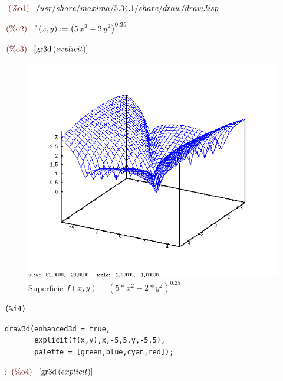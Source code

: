 \documentclass[12pt]{article}
\begin{document}
\begin{math}\displaystyle
\parbox{8ex}{\color{labelcolor}(\%o1) }
/usr/share/maxima/5.34.1/share/draw/draw.lisp
\end{math}

\begin{math}\displaystyle
\parbox{8ex}{\color{labelcolor}(\%o2) }
\mathrm{f}\left( x,y\right) :={\left( 5\,{x}^{2}-2\,{y}^{2}\right) }^{0.25}
\end{math}

\begin{math}\displaystyle
\parbox{8ex}{\color{labelcolor}(\%o3) }
[\mathrm{gr3d}\left( explicit\right) ]
\end{math}

\begin{figure}[H]
\centering
\includegraphics[scale=0.5]{3.png}
\caption{Superficie $f(x,y)= (5*x^2-2*y^2)^0.25$ }
\end{figure}

\noindent

\begin{minipage}[t]{8ex}{\color{red}\bf
\begin{verbatim}
(%i4) 
\end{verbatim}}
\end{minipage}
\begin{minipage}[t]{\textwidth}{\color{blue}
\begin{verbatim}
draw3d(enhanced3d = true,
       explicit(f(x,y),x,-5,5,y,-5,5),
       palette = [green,blue,cyan,red]);
\end{verbatim}}
\end{minipage}
:
\begin{math}\displaystyle
\parbox{8ex}{\color{labelcolor}(\%o4) }
[\mathrm{gr3d}\left( explicit\right) ]
\end{math}
\end{document}
